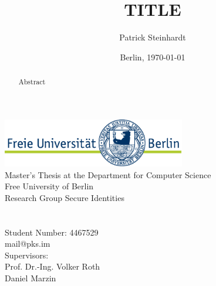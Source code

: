 \documentclass[12pt,a4paper,english]{article}
\title{TITLE}
\author{Patrick Steinhardt}
\date{Berlin, \today}
\begin{document}
    \begin{titlepage}
        \makeatletter
        \begin{center}
            \includegraphics[width=0.6\textwidth]{../resources/fu-logo.pdf}\\
            {\normalsize Master's Thesis at the Department for Computer Science\\Free University of Berlin\\Research Group Secure Identities}\\[8ex]
            {\Large \@title}\\[6ex]
            {\large \@author}\\
            {\normalsize Student Number: 4467529}\\
            {\normalsize mail@pks.im}\\[4ex]
            {\normalsize Supervisors:\\Prof. Dr.-Ing. Volker Roth\\Daniel Marzin}\\[4ex]
            {\normalsize \@date}
        \end{center}
        \makeatother

        \vfill{}
        \begin{abstract}

            Abstract

        \end{abstract}
        \vfill{}
    \end{titlepage}

    
    \clearpage

    \tableofcontents
    \clearpage
    \listoffigures
    \clearpage
    \lstlistoflistings
    \clearpage

    \pagestyle{fancy}
    \setcounter{page}{1}

    
    
    
    
    
    

    \clearpage
    \nocite{*}
    
\end{document}
